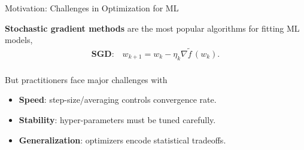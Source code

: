 \documentclass[notheorems]{beamer}
\begin{document}
    \begin{frame}{Motivation: Challenges in Optimization for ML}

        \textbf{Stochastic gradient methods} are the most popular algorithms for fitting ML models,
        \begin{align*}
            \textbf{SGD:} \quad w_{k + 1} = w_k - \eta_k \nabla \tilde{f} \, (w_k). \\
        \end{align*}


        But practitioners face major challenges with \vspace{0.5em}
        \begin{itemize}
            \item \textbf{Speed}: step-size/averaging controls convergence rate.
            \item \textbf{Stability}: hyper-parameters must be tuned carefully.
            \item \textbf{Generalization}: optimizers encode statistical tradeoffs.
        \end{itemize}
        \vspace{1em}

    \end{frame}
\end{document}
